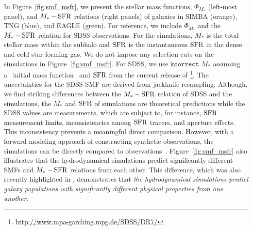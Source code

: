 In Figure~\ref{fig:smf_msfr}, we present the stellar mass functions,
$\Phi_{M_*}$ (left-most panel), and $M_*-{\rm SFR}$ relations (right panels) of
galaxies in SIMBA (orange), TNG (blue), and EAGLE (green). For reference, we
include $\Phi_{M_*}$ and the 
$M_*-{\rm SFR}$ relation for SDSS observations. For the simulations, $M_*$ is the
total stellar mass within the subhalo and ${\rm SFR}$ is the instantaneous ${\rm SFR}$ in the
dense and cold star-forming gas. 
We do not impose any selection cuts on the simulations in Figure~\ref{fig:smf_msfr}. 
For SDSS, we use $\mathtt{kcorrect}$ $M_*$ assuming a~\cite{chabrier2003}
initial mass function~\citep{blanton2007a} and ${\rm SFR}$ from the
current release of \cite{brinchmann2004}\footnote{\url{http://www.mpa-garching.mpg.de/SDSS/DR7/}}.
The uncertainties for the SDSS SMF are derived from jackknife resampling.
Although, we find striking differences between the $M_*-{\rm SFR}$ relation of SDSS
and the simulations, the $M_*$ and ${\rm SFR}$ of simulations are theoretical
predictions while the SDSS values are measurements, which are subject to, for
instance, ${\rm SFR}$ measurement limits, inconsistencies among ${\rm SFR}$ tracers, and
aperture effects.
This inconsistency prevents a meaningful direct comparison. 
However, with a forward modeling approach of constructing synthetic
observations, the simulations can be directly compared to
observations~\citep[see \eg][Starkenburg et al. in prep.]{dickey2020}.
Figure~\ref{fig:smf_msfr} also illustrates that the hydrodynamical simulations
predict significantly different SMFs and $M_*-{\rm SFR}$ relations from each other.
This difference, which was also recently highlighted in \cite{hahn2019c},
demonstrates that \emph{the hydrodynamical simulations predict galaxy
populations with significantly different physical properties from one
another}.

